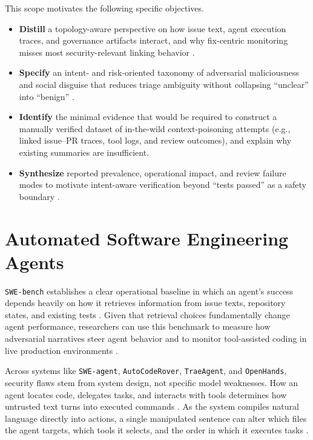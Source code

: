 \documentclass[11pt, a4paper]{article}
\begin{document}
This scope motivates the following specific objectives.
\begin{itemize}[label={}, leftmargin=2.5em, itemindent=-1.5em]
    \item \textbf{Distill} a topology-aware perspective on how issue text, agent execution traces, and governance artifacts interact, and why fix-centric monitoring misses most security-relevant linking behavior \citep{pr_graph_topologies_2024,agentic_coding_github_2026}.
    \item \textbf{Specify} an intent- and risk-oriented taxonomy of adversarial maliciousness and social disguise that reduces triage ambiguity without collapsing ``unclear'' into ``benign'' \citep{adv_bug_reports_2026,msr_user_ask_2023}.
    \item \textbf{Identify} the minimal evidence that would be required to construct a manually verified dataset of in-the-wild context-poisoning attempts (e.g., linked issue--PR traces, tool logs, and review outcomes), and explain why existing summaries are insufficient.
    \item \textbf{Synthesize} reported prevalence, operational impact, and review failure modes to motivate intent-aware verification beyond ``tests passed'' as a safety boundary \citep{ai_teammates_2025,your_ai_my_shell_2025}.
\end{itemize}

\clearpage
\section{\textbf{Automated Software Engineering Agents}}
\label{sec:agents}

\texttt{SWE-bench} establishes a clear operational baseline in which an agent's success depends heavily on how it retrieves information from issue texts, repository states, and existing tests \citep{swe_bench_2024,adv_bug_reports_2026}. Given that retrieval choices fundamentally change agent performance, researchers can use this benchmark to measure how adversarial narratives steer agent behavior and to monitor tool-assisted coding in live production environments \citep{swe_bench_2024,agentic_coding_github_2026}.

Across systems like \texttt{SWE-agent}, \texttt{AutoCodeRover}, \texttt{TraeAgent}, and \texttt{OpenHands}, security flaws stem from system design, not specific model weaknesses. How an agent locates code, delegates tasks, and interacts with tools determines how untrusted text turns into executed commands \citep{swe_agent_2024,openhands_2025}. As the system compiles natural language directly into actions, a single manipulated sentence can alter which files the agent targets, which tools it selects, and the order in which it executes tasks \citep{your_ai_my_shell_2025,agentic_coding_github_2026}.
\end{document}
